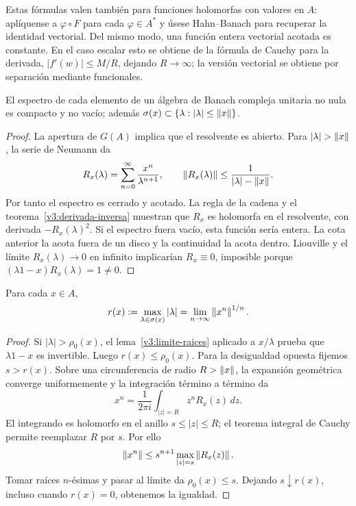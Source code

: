 Estas fórmulas valen también para funciones holomorfas con valores en $A$: aplíquense a $\varphi\circ F$ para cada $\varphi\in A^*$ y úsese Hahn--Banach para recuperar la identidad vectorial. Del mismo modo, una función entera vectorial acotada es constante. En el caso escalar esto se obtiene de la fórmula de Cauchy para la derivada, $|f'(w)|\le M/R$, dejando $R\to\infty$; la versión vectorial se obtiene por separación mediante funcionales.

\begin{teorema}\label{v3:espectro-algebra-compacto}
El espectro de cada elemento de un álgebra de Banach compleja unitaria no nula es compacto y no vacío; además $\sigma(x)\subset\{\lambda:|\lambda|\le\left\lVert x\right\rVert\}$.
\end{teorema}
\begin{proof}
La apertura de $G(A)$ implica que el resolvente es abierto. Para $|\lambda|>\norm x$, la serie de Neumann da
\[
 R_x(\lambda)=\sum_{n=0}^{\infty}\frac{x^n}{\lambda^{n+1}},
 \qquad\left\lVert R_x(\lambda)\right\rVert\le\frac1{|\lambda|-\left\lVert x\right\rVert}.
\]
Por tanto el espectro es cerrado y acotado. La regla de la cadena y el teorema~\ref{v3:derivada-inversa} muestran que $R_x$ es holomorfa en el resolvente, con derivada $-R_x(\lambda)^2$. Si el espectro fuera vacío, esta función sería entera. La cota anterior la acota fuera de un disco y la continuidad la acota dentro. Liouville y el límite $R_x(\lambda)\to0$ en infinito implicarían $R_x\equiv0$, imposible porque $(\lambda1-x)R_x(\lambda)=1\ne0$.
\end{proof}

\begin{teorema}\label{v3:radio-gelfand}
Para cada $x\in A$,
\[
 r(x):=\max_{\lambda\in\sigma(x)}|\lambda|
 =\lim_{n\to\infty}\left\lVert x^n\right\rVert^{1/n}.
\]
\end{teorema}
\begin{proof}
Si $|\lambda|>\rho_0(x)$, el lema~\ref{v3:limite-raices} aplicado a $x/\lambda$ prueba que $\lambda1-x$ es invertible. Luego $r(x)\le\rho_0(x)$. Para la desigualdad opuesta fijemos $s>r(x)$. Sobre una circunferencia de radio $R>\left\lVert x\right\rVert$, la expansión geométrica converge uniformemente y la integración término a término da
\[
 x^n=\frac1{2\pi i}\int_{|z|=R}z^nR_x(z)\,dz.
\]
El integrando es holomorfo en el anillo $s\le|z|\le R$; el teorema integral de Cauchy permite reemplazar $R$ por $s$. Por ello
\[
 \left\lVert x^n\right\rVert\le s^{n+1}\max_{|z|=s}\left\lVert R_x(z)\right\rVert.
\]
Tomar raíces $n$-ésimas y pasar al límite da $\rho_0(x)\le s$. Dejando $s\downarrow r(x)$, incluso cuando $r(x)=0$, obtenemos la igualdad.
\end{proof}

